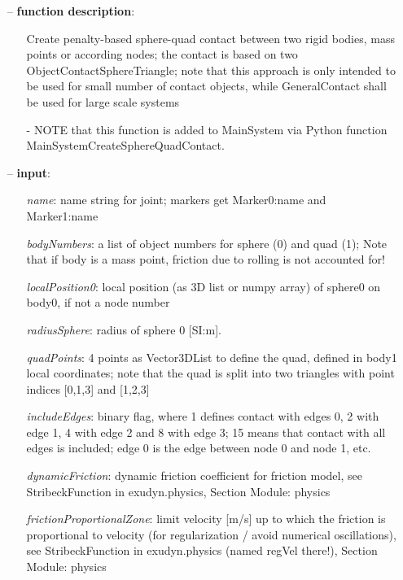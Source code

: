 \begin{itemize}[leftmargin=0.7cm]
\item[--]
{\bf function description}: \vspace{-6pt}
\begin{itemize}[leftmargin=1.2cm]
\setlength{\itemindent}{-0.7cm}
\item[]Create penalty-based sphere-quad contact between two rigid bodies, mass points or according nodes; the contact is based on two ObjectContactSphereTriangle; note that this approach is only intended to be used for small number of contact objects, while GeneralContact shall be used for large scale systems
\item[]- NOTE that this function is added to MainSystem via Python function MainSystemCreateSphereQuadContact.
\end{itemize}
\item[--]
{\bf input}: \vspace{-6pt}
\begin{itemize}[leftmargin=1.2cm]
\setlength{\itemindent}{-0.7cm}
\item[]{\it name}: name string for joint; markers get Marker0:name and Marker1:name
\item[]{\it bodyNumbers}: a list of object numbers for sphere (0) and quad (1); Note that if body is a mass point, friction due to rolling is not accounted for!
\item[]{\it localPosition0}: local position (as 3D list or numpy array) of sphere0 on body0, if not a node number
\item[]{\it radiusSphere}: radius of sphere 0 [SI:m].
\item[]{\it quadPoints}: 4 points as Vector3DList to define the quad, defined in body1 local coordinates; note that the quad is split into two triangles with point indices [0,1,3] and [1,2,3]
\item[]{\it includeEdges}: binary flag, where 1 defines contact with edges 0, 2 with edge 1, 4 with edge 2 and 8 with edge 3; 15 means that contact with all edges is included; edge 0 is the edge between node 0 and node 1, etc.
\item[]{\it dynamicFriction}: dynamic friction coefficient for friction model, see StribeckFunction in exudyn.physics, Section Module: physics
\item[]{\it frictionProportionalZone}: limit velocity [m/s] up to which the friction is proportional to velocity (for regularization / avoid numerical oscillations), see StribeckFunction in exudyn.physics (named regVel there!), Section Module: physics

\end{itemize}
\end{itemize}
